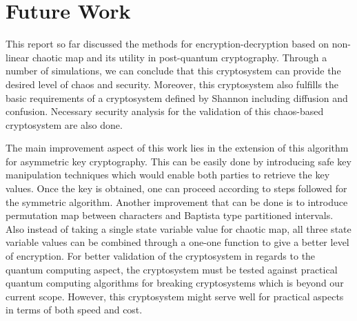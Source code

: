 \chapter{Future Work}
\label{chap:future}
\setlength{\parskip}{1.5mm}
This report so far discussed the methods for encryption-decryption based on non-linear chaotic map and its utility in post-quantum cryptography. Through a number of simulations, we can conclude that this cryptosystem can provide the desired level of chaos and security. Moreover, this cryptosystem also fulfills the basic requirements of a cryptosystem defined by Shannon including diffusion and confusion. Necessary security analysis for the validation of this chaos-based cryptosystem are also done.


The main improvement aspect of this work lies in the extension of this algorithm for asymmetric key cryptography. This can be easily done by introducing safe key manipulation techniques which would enable both parties to retrieve the key values. Once the key is obtained, one can proceed according to steps followed for the symmetric algorithm. Another improvement that can be done is to introduce permutation map between characters and Baptista type partitioned intervals. Also instead of taking a single state variable value for chaotic map, all three state variable values can be combined through a one-one function to give a better level of encryption. For better validation of the cryptosystem in regards to the quantum computing aspect, the cryptosystem must be tested against practical quantum computing algorithms for breaking cryptosystems which is beyond our current scope. However, this cryptosystem might serve well for practical aspects in terms of both speed and cost.  
